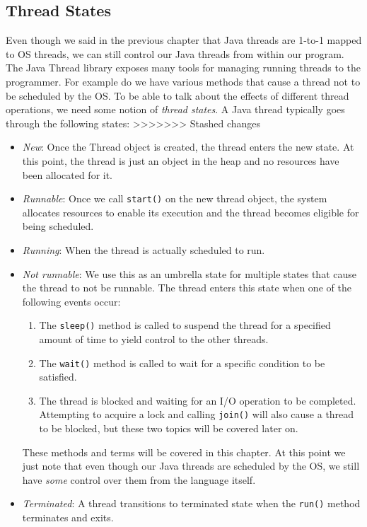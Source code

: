 \documentclass[main.tex]{subfiles}
\begin{document}
\subsection{Thread States}
Even though we said in the previous chapter that Java threads are 1-to-1 mapped to OS threads, we can still control our Java threads from within our program. The Java Thread library exposes many tools for managing running threads to the programmer. For example do we have various methods that cause a thread not to be scheduled by the OS. To be able to talk about the effects of different thread operations, we need some notion of \textit{thread states}. A Java thread typically goes through the following states:
>>>>>>> Stashed changes
\begin{itemize}
    \item \textit{New}: Once the Thread object is created, the thread enters the new state. At this point, the thread is just an object in the heap and no resources have been allocated for it.
    \item \textit{Runnable}: Once we call \texttt{start()} on the new thread object, the system allocates resources to enable its execution and the thread becomes eligible for being scheduled.
    \item \textit{Running}: When the thread is actually scheduled to run.
    \item \textit{Not runnable}: We use this as an umbrella state for multiple states that cause the thread to not be runnable. The thread enters this state when one of the following events occur:
          \begin{enumerate}
              \item The \texttt{sleep()} method is called to suspend the thread for a specified amount of time to yield control to the other threads.
              \item The \texttt{wait()} method is called to wait for a specific condition to be satisfied.
              \item The thread is blocked and waiting for an I/O operation to be completed. Attempting to acquire a lock and calling \texttt{join()} will also cause a thread to be blocked, but these two topics will be covered later on.
          \end{enumerate}
          These methods and terms will be covered in this chapter. At this point we just note that even though our Java threads are scheduled by the OS, we still have \textit{some} control over them from the language itself.
    \item \textit{Terminated}: A thread transitions to terminated state when the \texttt{run()} method terminates and exits.
\end{itemize}
\end{document}

